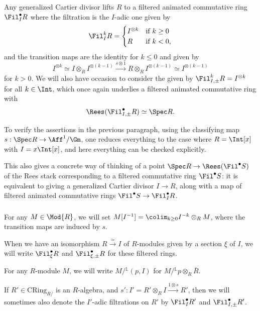 \documentclass[10pt]{amsart}
\begin{document}
\subsubsection{}
Any generalized Cartier divisor lifts $R$ to a filtered animated commutative ring $\Fil^\bullet_I R$ where the filtration is the $I$-adic one given by
\[
\Fil^k_I R = \begin{cases}
I^{\otimes k}&\text{if $k\ge 0$}\\
R&\text{if $k<0$},
\end{cases}
\]
and the transition maps are the identity for $k\leq 0$ and given by 
\[
I^{\otimes k} \simeq I\otimes_RI^{\otimes(k-1)}\xrightarrow{s\otimes 1}R\otimes_RI^{\otimes(k-1)}\simeq I^{\otimes (k-1)}
\]
for $k>0$. We will also have occasion to consider the  given by $\Fil^k_{I,\pm} R = I^{\otimes k}$ for all $k\in \Int$, which once again underlies a filtered animated commutative ring with
\[
\Rees(\Fil^\bullet_{I,\pm}R)\simeq \Spec R.
\]

To verify the assertions in the previous paragraph, using the classifying map $s:\Spec R\to \Aff^1/\Gm$, one reduces everything to the case where $R = \Int[x]$ with $I=x\Int[x]$, and here everything can be checked explicitly.

\begin{remark}
\label{rem:rees_stack_points}
This also gives a concrete way of thinking of a point $\Spec R\to \Rees(\Fil^\bullet S)$ of the Rees stack corresponding to a filtered commutative ring $\Fil^\bullet S$: it is equivalent to giving a generalized Cartier divisor $I\to R$, along with a map of filtered animated commutative rings $\Fil^\bullet S\to \Fil^\bullet_{I}R$.
\end{remark}

\subsubsection{}
For any $M\in \Mod{R}$, we will set $M[I^{-1}] = \colim_{k\ge 0} I^{-k}\otimes_RM$, where the transition maps are induced by $s$.

When we have an isomorphism $R\xrightarrow{\simeq}I$ of $R$-modules given by a section $\xi$ of $I$, we will write $\Fil^\bullet_\xi R$ and $\Fil^\bullet_{\xi,\pm}R$ for these filtered rings.

For any $R$-module $M$, we will write $M/{}^{\mathbb{L}}(p,I)$ for $M/{}^{\mathbb{L}}p\otimes_R\overline{R}$.

If $R'\in \mathrm{CRing}_{R/}$ is an $R$-algebra, and $s':I' = R'\otimes_RI\xrightarrow{1\otimes s}R'$, then we will sometimes also denote the $I'$-adic filtrations on $R'$ by $\Fil^\bullet_I R'$ and $\Fil^\bullet_{I,\pm}R'$.
\end{document}
